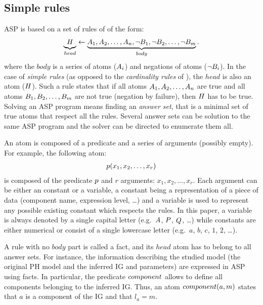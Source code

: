 \subsection{Simple rules}\label{sssec:simple_rules}
ASP is based on a set of rules of of the form:
\begin{align*}
  \underbrace{{\ }H_{\ }}_{head} \leftarrow \underbrace{A_1, A_2, \dots, A_n, \neg B_1, \neg B_2, \dots, \neg B_m}_{body}.
\end{align*}
where the $body$ is a series of atoms ($A_i$) and negations of atoms ($\neg B_i$).
In the case of \emph{simple rules} (as opposed to the \emph{cardinality rules} of ), the $head$ is also an atom ($H$).
Such a rule states that if all atoms $A_1, A_2, \dots, A_n$ are true
and all atoms $B_1, B_2, \dots, B_m$ are not true (negation by failure), then $H$ has to be true.
Solving an ASP program means finding an \emph{answer set}, that is a minimal set of true atoms that respect all the rules.
Several answer sets can be solution to the same ASP program and the solver can be directed to enumerate them all.

An atom is composed of a predicate and a series of arguments (possibly empty).
For example, the following atom:
\begin{align*}
  p(x_1, x_2, \dots, x_r)
\end{align*}
is composed of the predicate $p$ and $r$ arguments: $x_1, x_2, \dots, x_r$.
Each argument can be either an constant or a variable, %
a constant being a representation of a piece of data (component name, expression level, …)
and a variable is used to represent any possible existing constant which respects the rules.
In this paper, a variable is always denoted by a single capital letter (e.g.~$A$, $P$, $Q$, …)
while constants are either numerical or consist of a single lowercase letter (e.g.~$a$, $b$, $c$, $1$, $2$, …).

A rule with no $body$ part is called a fact, and its $head$ atom has to belong to all answer sets.
For instance, the information describing the studied model (the original PH model and the inferred IG and parameters) are expressed in ASP using facts.
In particular, the predicate $component$ allows to define all components belonging to the inferred IG.
Thus, an atom $component(a, m)$ states that $a$ is a component of the IG and that $l_a = m$.

